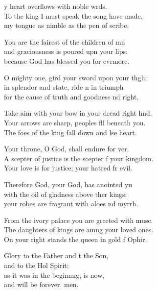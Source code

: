 \settowidth{\versewidth}{A scepter of justice is the scepter of your kingdom. *}
\begin{psalmverse}%
  \begin{patverse}
y heart overflows with noble wrds.\Flex\\
To the king I must speak the song  have made,\Med\\
my tongue as nimble as the pen of  scribe.

You are the fairest of the children of mn\Flex\\
and graciousness is poured upn your lips:\Med\\
because God has blessed you for evrmore.

O mighty one, gird your sword upon your th\pointup{\i}gh;\Flex\\
in splendor and state, ride n in triumph\Med\\
for the cause of truth and goodness nd right.

Take aim with your bow in your dread right hnd.\Flex\\
Your arrows are sharp, peoples fll beneath you.\Med\\
The foes of the king fall down and lse heart.

Your throne, O God, shall endure for ver.\Flex\\
A scepter of justice is the scepter f your kingdom.\Med\\
Your love is for justice; your hatred fr evil.

Therefore God, your God, has anointed yu\Flex\\
with the oil of gladness above ther kings:\Med\\
your robes are fragrant with aloes nd myrrh.

From the ivory palace you are greeted with mus\pointup{\i}c.\Flex\\
The daughters of kings are amng your loved ones.\Med\\
On your right stands the queen in gold f Ophir.

Glory to the Father and t the Son,\Med\\
and to the Hol Spirit:\\
as it was in the beginn\pointup{\i}ng, is now,\Med\\
and will be forever. men. 
  \end{patverse}
\end{psalmverse}
